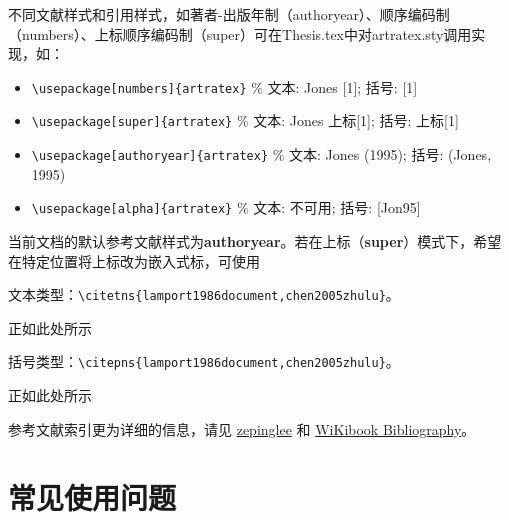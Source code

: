 不同文献样式和引用样式，如著者-出版年制（authoryear）、顺序编码制（numbers）、上标顺序编码制（super）可在Thesis.tex中对artratex.sty调用实现，如：
\begin{itemize}
    \footnotesize
    \item \verb+\usepackage[numbers]{artratex}+ $\%$ 文本: Jones [1]; 括号: [1]
    \item \verb+\usepackage[super]{artratex}+ $\%$ 文本: Jones 上标[1]; 括号: 上标[1]
    \item \verb+\usepackage[authoryear]{artratex}+ $\%$ 文本: Jones (1995); 括号: (Jones, 1995)
    \item \verb+\usepackage[alpha]{artratex}+ $\%$ 文本: 不可用; 括号: [Jon95]
\end{itemize}

当前文档的默认参考文献样式为\textbf{authoryear}。若在上标（\textbf{super}）模式下，希望在特定位置将上标改为嵌入式标，可使用

文本类型：\verb|\citetns{lamport1986document,chen2005zhulu}|。

正如此处所示

括号类型：\verb|\citepns{lamport1986document,chen2005zhulu}|。

正如此处所示

参考文献索引更为详细的信息，请见 \href{https://github.com/zepinglee/gbt7714-bibtex-style}{zepinglee} 和 \href{https://en.wikibooks.org/wiki/LaTeX/Bibliography_Management}{WiKibook Bibliography}。

\nocite{*}

\section{常见使用问题}\label{sec:qa}

